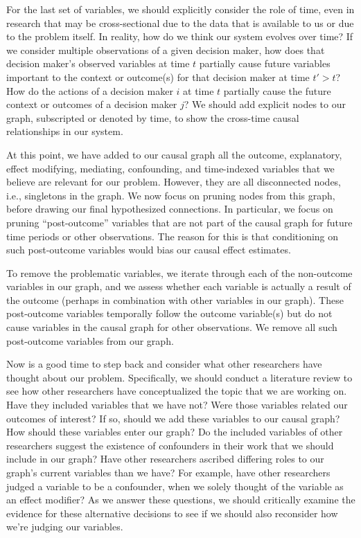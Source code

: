 For the last set of variables, we should explicitly consider the role of time, even in research that may be cross-sectional due to the data that is available to us or due to the problem itself.
In reality, how do we think our system evolves over time?
If we consider multiple observations of a given decision maker, how does that decision maker's observed variables at time $t$ partially cause future variables important to the context or outcome(s) for that decision maker at time $t' > t$?
How do the actions of a decision maker $i$ at time $t$ partially cause the future context or outcomes of a decision maker $j$?
We should add explicit nodes to our graph, subscripted or denoted by time, to show the cross-time causal relationships in our system.

At this point, we have added to our causal graph all the outcome, explanatory, effect modifying, mediating, confounding, and time-indexed variables that we believe are relevant for our problem.
However, they are all disconnected nodes, i.e., singletons in the graph.
We now focus on pruning nodes from this graph, before drawing our final hypothesized connections.
In particular, we focus on pruning ``post-outcome'' variables that are not part of the causal graph for future time periods or other observations.
The reason for this is that conditioning on such post-outcome variables would bias our causal effect estimates.

To remove the problematic variables, we iterate through each of the non-outcome variables in our graph, and we assess whether each variable is actually a result of the outcome (perhaps in combination with other variables in our graph).
These post-outcome variables temporally follow the outcome variable(s) but do not cause variables in the causal graph for other observations.
We remove all such post-outcome variables from our graph.

Now is a good time to step back and consider what other researchers have thought about our problem.
Specifically, we should conduct a literature review to see how other researchers have conceptualized the topic that we are working on.
Have they included variables that we have not?
Were those variables related our outcomes of interest?
If so, should we add these variables to our causal graph? How should these variables enter our graph?
Do the included variables of other researchers suggest the existence of confounders in their work that we should include in our graph?
Have other researchers ascribed differing roles to our graph's current variables than we have?
For example, have other researchers judged a variable to be a confounder, when we solely thought of the variable as an effect modifier?
As we answer these questions, we should critically examine the evidence for these alternative decisions to see if we should also reconsider how we're judging our variables.

